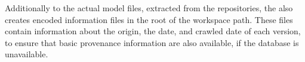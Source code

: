 Additionally to the actual model files, extracted from the repositories, the \modelcrawler also creates \json encoded information files in the root of the workspace path. These files contain information about the origin, the date, and crawled date of each version, to ensure that basic provenance information are also available, if the \masymos database is unavailable.

